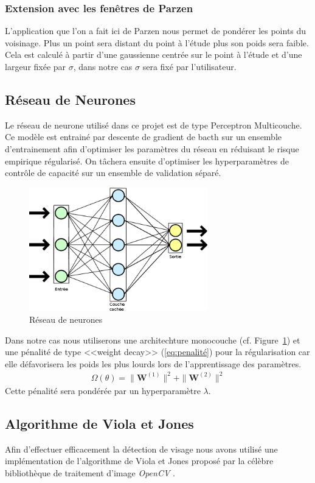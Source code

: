 \documentclass[a4paper,10pt,twocolumn]{extarticle}
\begin{document}
\subsubsection{Extension avec les fenêtres de Parzen}
L'application que l'on a fait ici de Parzen nous permet de pondérer les points du voisinage. Plus un point sera distant du point à l'étude plus son poids sera faible. Cela est calculé à partir d'une gaussienne centrée sur le point à l'étude et d'une largeur fixée par $\sigma$, dans notre cas $\sigma$ sera fixé par l'utilisateur.

\subsection{Réseau de Neurones}
Le réseau de neurone utilisé dans ce projet est de type Perceptron Multicouche. Ce modèle est entrainé par descente de gradient de bacth sur un ensemble d'entrainement afin d'optimiser les paramètres du réseau en réduisant le risque empirique régularisé. On tâchera ensuite d'optimiser les hyperparamètres de contrôle de capacité sur un ensemble de validation séparé.
\begin{figure}[H]
  \begin{center}
    \includegraphics[width=220pt]{images_rapport/Neural_network.png}
    \caption{Réseau de neurones}
    \label{fig:nnet}
  \end{center}
\end{figure}
Dans notre cas nous utiliserons une architechture monocouche (cf. Figure~\ref{fig:nnet}) et une pénalité de type <<weight decay>> (\ref{eq:penalité}) pour la régularisation car elle défavorisera les poids les plus lourds lors de l'apprentissage des paramètres. 
\begin{align}\label{eq:penalité}
  \Omega(\theta) = \| \mathbf{W}^{(1)} \|^2 + \| \mathbf{W}^{(2)} \|^2
\end{align}
Cette pénalité sera pondérée par un hyperparamètre $\lambda$.

\subsection{Algorithme de Viola et Jones}
Afin d'effectuer efficacement la détection de visage nous avons utilisé une implémentation de l'algorithme de Viola et Jones \cite{viola01} proposé par la célèbre bibliothèque de traitement d'image \textit{OpenCV} \cite{opencv}.
\end{document}
